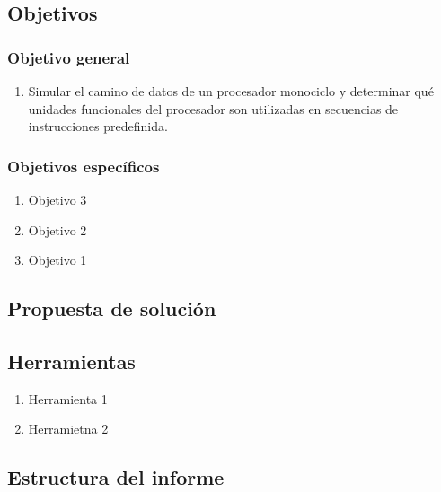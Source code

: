 \subsection{Objetivos}
\subsubsection{Objetivo general}
\begin{enumerate}
    \item Simular el camino de datos de un procesador monociclo y determinar qué unidades funcionales del procesador son utilizadas en secuencias de instrucciones predefinida.
\end{enumerate}
\subsubsection{Objetivos específicos}
\begin{enumerate}
	\item Objetivo 3
	\item Objetivo 2
	\item Objetivo 1
\end{enumerate}

\subsection{Propuesta de solución}


\subsection{Herramientas}

\begin{enumerate}
    \item Herramienta 1
    \item Herramietna 2
\end{enumerate}

\subsection{Estructura del informe}

